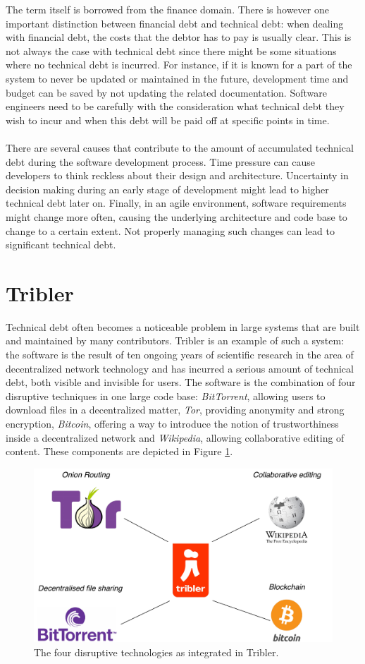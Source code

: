 The term itself is borrowed from the finance domain\cite{guo2011portfolio}.
There is however one important distinction between financial debt and technical debt: when dealing with financial debt, the costs that the debtor has to pay is usually clear.
This is not always the case with technical debt since there might be some situations where no technical debt is incurred.
For instance, if it is known for a part of the system to never be updated or maintained in the future, development time and budget can be saved by not updating the related documentation.
Software engineers need to be carefully with the consideration what technical debt they wish to incur and when this debt will be paid off at specific points in time.\\\\
There are several causes that contribute to the amount of accumulated technical debt during the software development process\cite{martini2014architecture}. Time pressure can cause developers to think reckless about their design and architecture. Uncertainty in decision making during an early stage of development might lead to higher technical debt later on. Finally, in an agile environment, software requirements might change more often, causing the underlying architecture and code base to change to a certain extent. Not properly managing such changes can lead to significant technical debt.

\section{Tribler}
Technical debt often becomes a noticeable problem in large systems that are built and maintained by many contributors. Tribler is an example of such a system: the software is the result of ten ongoing years of scientific research in the area of decentralized network technology and has incurred a serious amount of technical debt, both visible and invisible for users.
The software is the combination of four disruptive techniques in one large code base: \emph{BitTorrent}, allowing users to download files in a decentralized matter, \emph{Tor}, providing anonymity and strong encryption, \emph{Bitcoin}, offering a way to introduce the notion of trustworthiness inside a decentralized network and \emph{Wikipedia}, allowing collaborative editing of content. These components are depicted in Figure \ref{fig:tribler-connections}.\\

\begin{figure}[h!]
	\centering
	\includegraphics[width=0.6\columnwidth]{images/introduction/tribler_connections}
	\caption{The four disruptive technologies as integrated in Tribler.}
	\label{fig:tribler-connections}
\end{figure}

